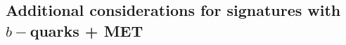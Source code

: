 %
%

 \subsection{\texorpdfstring{Additional considerations for signatures with $b-$quarks + MET}{Additional considerations for signatures  with b-quarks + MET}}
 \label{sec:singleb}
 
